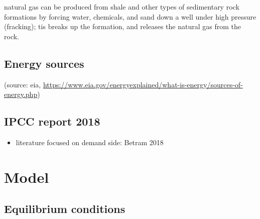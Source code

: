 natural gas can be produced from shale and other types of sedimentary rock formations by forcing water, chemicals, and sand down a well under high pressure (fracking); tis breaks up the formation, and releases the natural gas from the rock. 
\subsection{Energy sources}
(source: eia, \url{https://www.eia.gov/energyexplained/what-is-energy/sources-of-energy.php})

\subsection{IPCC report 2018 \citep{Rogelj2018MitigationDevelopment.}}
\begin{itemize}
\item literature focused on demand side: Betram 2018
\end{itemize}

\section{Model}
\subsection{Equilibrium conditions}


